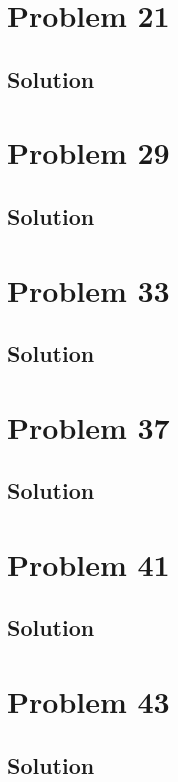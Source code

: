 \documentclass[12pt]{article}
\begin{document}
    \section{Problem 21}

        \subsection{Solution}

    \pagebreak
    \section{Problem 29}

        \subsection{Solution}

    \pagebreak
    \section{Problem 33}

        \subsection{Solution}

    \pagebreak
    \section{Problem 37}

        \subsection{Solution}

    \pagebreak
    \section{Problem 41}

        \subsection{Solution}

    \pagebreak
    \section{Problem 43}

        \subsection{Solution}
\end{document}

